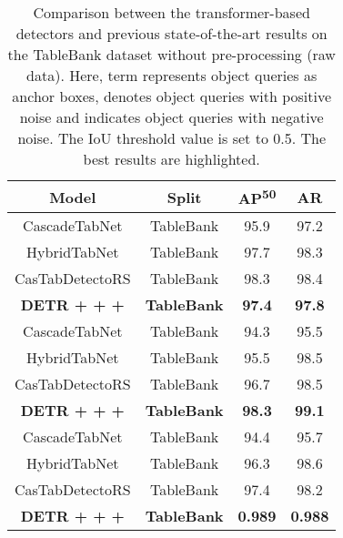 \documentclass[sn-mathphys]{sn-jnl}\jyear{2021}\theoremstyle{thmstyleone}\newtheorem{theorem}{Theorem}\newtheorem{proposition}[theorem]{Proposition}\theoremstyle{thmstyletwo}\newtheorem{example}{Example}\newtheorem{remark}{Remark}\theoremstyle{thmstylethree}\newtheorem{definition}{Definition}\usepackage{amsmath}
\begin{document}
\begin{table*}
\tiny
\begin{center}
\caption{Comparison between the transformer-based detectors and previous state-of-the-art results on the TableBank dataset \colorbox{red!25}{without pre-processing} (raw data). Here, term  represents object queries as anchor boxes,  denotes object queries with positive noise and  indicates object queries with negative noise. The IoU threshold value is set to 0.5. The best results are highlighted.}\label{tab:TableBank2}\begin{tabular*}{\textwidth}{@{\extracolsep{\fill}}cccc@{\extracolsep{\fill}}}
\toprule
\textbf{Model} &
\textbf{Split} &
\textbf{AP\textsuperscript{50}} &
\textbf{AR} \\ 
\midrule
 CascadeTabNet \cite{Ayan29} &
 TableBank &
  95.9 &
  97.2 \\ \midrule
  HybridTabNet \cite{HybridTabNet}  &
  TableBank&
  97.7 &
  98.3  \\ \midrule
  CasTabDetectoRS \cite{CasTab45}  &
  TableBank &
  98.3 &
  98.4  \\ \midrule
  \textbf{DETR +  +  + } &
  \textbf{TableBank}&
  \textbf{97.4} &
  \textbf{97.8}  \\ \midrule
 CascadeTabNet \cite{Ayan29}  &
 TableBank&
  94.3  &
  95.5 \\ \midrule
  HybridTabNet \cite{HybridTabNet} &
  TableBank&
  95.5 &
  98.5   \\ \midrule
  CasTabDetectoRS \cite{CasTab45}  &
  TableBank &
  96.7 &
  98.5  \\ \midrule
 \textbf{DETR +  +  + } &
 \textbf{TableBank}&
 \textbf{98.3} &
 \textbf{99.1}\\
 \midrule
 CascadeTabNet \cite{Ayan29} &
 TableBank &
  94.4  &
  95.7 \\ \midrule
  HybridTabNet \cite{HybridTabNet}   &
 TableBank&
  96.3 &
  98.6  \\ \midrule
  CasTabDetectoRS \cite{CasTab45} &
   TableBank &
   97.4&
  98.2   \\ \midrule
 \textbf{DETR +  +  + } &
 \textbf{TableBank}&
 \textbf{0.989} &
 \textbf{0.988}  \\ 
\bottomrule
\end{tabular*}
\end{center}
\end{table*} 
\end{document}

